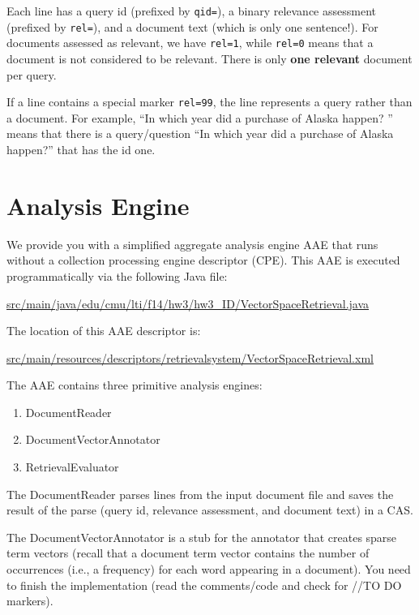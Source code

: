\documentclass[oneside,11pt]{memoir}
\begin{document}
Each line has a query id (prefixed by \texttt{qid=}), 
a binary relevance assessment (prefixed by \texttt{rel=}), 
and a document text (which is only one sentence!). 
For documents assessed as relevant, we have \texttt{rel=1},
while \texttt{rel=0} means that a document is not considered to be relevant.
There is only \textbf{one relevant} document per query.

If a line contains a special marker \texttt{rel=99},
the line represents a query rather than a document.
For example, ``In which year did a purchase of Alaska happen?
'' means that there is a query/question ``In which year did a purchase of Alaska happen?'' 
that has the id one.

\section{Analysis Engine}
\label{SectionAe}
We provide you with a simplified aggregate analysis engine AAE that runs without 
a collection processing engine descriptor (CPE).
This AAE is executed programmatically via the following Java file:

\begin{center}\url{src/main/java/edu/cmu/lti/f14/hw3/hw3_ID/VectorSpaceRetrieval.java} \end{center}

The location of this AAE descriptor is:

\begin{center}\url{src/main/resources/descriptors/retrievalsystem/VectorSpaceRetrieval.xml} \end{center}

The AAE contains three primitive analysis engines:
\begin{enumerate}
\item DocumentReader
\item DocumentVectorAnnotator
\item RetrievalEvaluator
\end{enumerate}

The DocumentReader parses lines from the input document file and saves the result of the parse (query id, relevance assessment, and document text) in a CAS.

The DocumentVectorAnnotator is a stub for the annotator that creates sparse term vectors
(recall that a document term vector contains the number of occurrences (i.e., a frequency)
for each word appearing in a document). 
You need to finish the implementation (read the comments/code and check for //TO DO markers).
\end{document}

